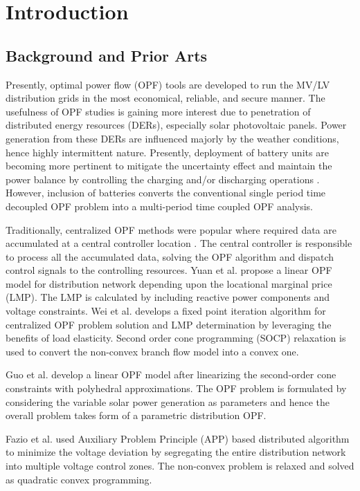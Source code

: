 \documentclass{article}
\begin{document}
\section{Introduction}

\subsection{Background and Prior Arts}
Presently, optimal power flow (OPF) tools are developed to run the MV/LV distribution grids in the most economical, reliable, and secure manner. The usefulness of OPF studies is gaining more interest due to penetration of distributed energy resources (DERs), especially solar photovoltaic panels. Power generation from these DERs are influenced majorly by the weather conditions, hence highly intermittent nature. Presently, deployment of battery units are becoming more pertinent to mitigate the uncertainty effect and maintain the power balance by controlling the charging and/or discharging operations \cite{tgangwar}. However, inclusion of batteries converts the conventional single period time decoupled OPF problem into a multi-period time coupled OPF analysis.

Traditionally, centralized OPF methods were popular where required data are accumulated at a central controller location \cite{spaul}. The central controller is responsible to process all the accumulated data, solving the OPF algorithm and dispatch control signals to the controlling resources. Yuan et al. \cite{Yuan} propose a linear OPF model for distribution network depending upon the locational marginal price (LMP). The LMP is calculated by including reactive power components and voltage constraints. Wei et al. \cite{Wei} develops a fixed point iteration algorithm for centralized OPF problem solution and LMP determination by leveraging the benefits of load elasticity. Second order cone programming (SOCP) relaxation is used to convert the non-convex branch flow model into a convex one. 

Guo et al. \cite{Guo} develop a linear OPF model after linearizing the second-order cone constraints with polyhedral approximations. The OPF problem is formulated by considering the variable solar power generation as parameters and hence the overall problem takes form of a parametric distribution OPF. 



Fazio et al. \cite{Fazio} used Auxiliary Problem Principle (APP) based distributed algorithm to minimize the voltage deviation by segregating the entire distribution network into multiple voltage control zones. The non-convex problem is relaxed and solved as quadratic convex programming.
\end{document}

